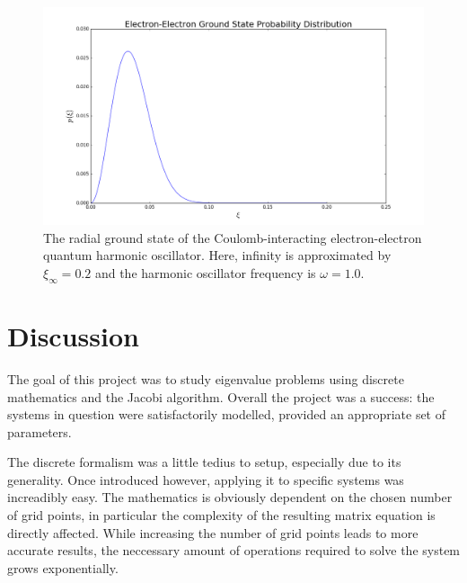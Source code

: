 \documentclass[reprint,english]{revtex4-1}
\begin{document}
\begin{figure}[ht]
\centering
\includegraphics[scale=0.25]{InteractingElectrons/plots/prob200_10.png}
\caption{The radial ground state of the Coulomb-interacting electron-electron quantum harmonic oscillator. Here, infinity is approximated by \(\xi_\infty=0.2\) and the harmonic oscillator frequency is \(\omega=1.0\).}
\label{fig:interactingelectrons_eigenvectors2}
\end{figure}
\section{Discussion}
The goal of this project was to study eigenvalue problems using discrete mathematics and the Jacobi algorithm. Overall the project was a success: the systems in question were satisfactorily modelled, provided an appropriate set of parameters.

The discrete formalism was a little tedius to setup, especially due to its generality. Once introduced however, applying it to specific systems was increadibly easy. The mathematics is obviously dependent on the chosen number of grid points, in particular the complexity of the resulting matrix equation is directly affected. While increasing the number of grid points leads to more accurate results, the neccessary amount of operations required to solve the system grows exponentially.
\end{document}
